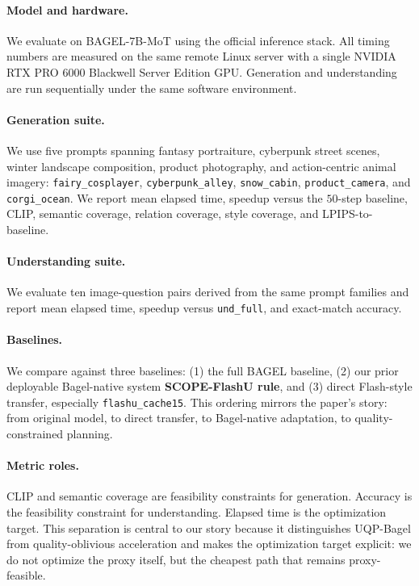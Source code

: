 \documentclass{article}
\begin{document}
\paragraph{Model and hardware.} We evaluate on BAGEL-7B-MoT using the official inference stack. All timing numbers are measured on the same remote Linux server with a single NVIDIA RTX PRO 6000 Blackwell Server Edition GPU. Generation and understanding are run sequentially under the same software environment.

\paragraph{Generation suite.} We use five prompts spanning fantasy portraiture, cyberpunk street scenes, winter landscape composition, product photography, and action-centric animal imagery: \texttt{fairy\_cosplayer}, \texttt{cyberpunk\_alley}, \texttt{snow\_cabin}, \texttt{product\_camera}, and \texttt{corgi\_ocean}. We report mean elapsed time, speedup versus the $50$-step baseline, CLIP, semantic coverage, relation coverage, style coverage, and LPIPS-to-baseline.

\paragraph{Understanding suite.} We evaluate ten image-question pairs derived from the same prompt families and report mean elapsed time, speedup versus \texttt{und\_full}, and exact-match accuracy.

\paragraph{Baselines.} We compare against three baselines: (1) the full BAGEL baseline, (2) our prior deployable Bagel-native system \textbf{SCOPE-FlashU rule}, and (3) direct Flash-style transfer, especially \texttt{flashu\_cache15}. This ordering mirrors the paper's story: from original model, to direct transfer, to Bagel-native adaptation, to quality-constrained planning.

\paragraph{Metric roles.} CLIP and semantic coverage are feasibility constraints for generation. Accuracy is the feasibility constraint for understanding. Elapsed time is the optimization target. This separation is central to our story because it distinguishes UQP-Bagel from quality-oblivious acceleration and makes the optimization target explicit: we do not optimize the proxy itself, but the cheapest path that remains proxy-feasible.
\end{document}
